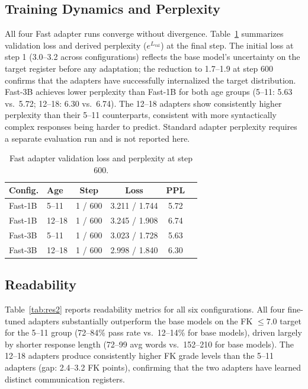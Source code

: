 \documentclass[journal]{IEEEtai}
\begin{document}
\subsection{Training Dynamics and Perplexity}

All four Fast adapter runs converge without divergence. Table~\ref{tab:res1} summarizes validation loss and derived perplexity ($e^{L_{\text{val}}}$) at the final step. The initial loss at step 1 (3.0--3.2 across configurations) reflects the base model's uncertainty on the target register before any adaptation; the reduction to 1.7--1.9 at step 600 confirms that the adapters have successfully internalized the target distribution. Fast-3B achieves lower perplexity than Fast-1B for both age groups (5--11: 5.63 vs.\ 5.72; 12--18: 6.30 vs.\ 6.74). The 12--18 adapters show consistently higher perplexity than their 5--11 counterparts, consistent with more syntactically complex responses being harder to predict. Standard adapter perplexity requires a separate evaluation run and is not reported here.

\begin{table}[!t]
  \centering
  \caption{Fast adapter validation loss and perplexity at step 600.}
  \label{tab:res1}
  \small
  \begin{tabular}{llcccc}
    \hline
    Config. & Age & Step & Loss & PPL \\
    \hline
    Fast-1B & 5--11  & 1 / 600 & 3.211 / 1.744 & 5.72 \\
    Fast-1B & 12--18 & 1 / 600 & 3.245 / 1.908 & 6.74 \\
    Fast-3B & 5--11  & 1 / 600 & 3.023 / 1.728 & 5.63 \\
    Fast-3B & 12--18 & 1 / 600 & 2.998 / 1.840 & 6.30 \\
    \hline
  \end{tabular}
\end{table}

\subsection{Readability}

Table~\ref{tab:res2} reports readability metrics for all six configurations. All four fine-tuned adapters substantially outperform the base models on the FK $\leq 7.0$ target for the 5--11 group (72--84\% pass rate vs.\ 12--14\% for base models), driven largely by shorter response length (72--99 avg words vs.\ 152--210 for base models). The 12--18 adapters produce consistently higher FK grade levels than the 5--11 adapters (gap: 2.4--3.2 FK points), confirming that the two adapters have learned distinct communication registers.
\end{document}
